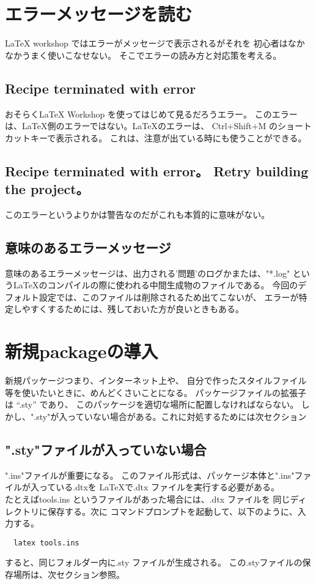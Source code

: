 \documentclass{ltjsarticle}
\begin{document}
\section{エラーメッセージを読む}
LaTeX workshop ではエラーがメッセージで表示されるがそれを
初心者はなかなかうまく使いこなせない。
そこでエラーの読み方と対応策を考える。
\subsection{Recipe terminated with error}
おそらくLaTeX Workshop を使ってはじめて見るだろうエラー。
このエラーは、\LaTeX 側のエラーではない。\LaTeX のエラーは、
Ctrl+Shift+M のショートカットキーで表示される。
これは、注意が出ている時にも使うことができる。
\subsection{Recipe terminated with error。 Retry building the project。}
このエラーというよりかは警告なのだがこれも本質的に意味がない。
\subsection{意味のあるエラーメッセージ}
意味のあるエラーメッセージは、出力される'問題'のログかまたは、"*.log"
という\LaTeX のコンパイルの際に使われる中間生成物のファイルである。
今回のデフォルト設定では、このファイルは削除されるため出てこないが、
エラーが特定しやすくするためには、残しておいた方が良いときもある。

\section{新規packageの導入}
新規パッケージつまり、インターネット上や、
自分で作ったスタイルファイル等を使いたいときに、めんどくさいことになる。
パッケージファイルの拡張子は “.sty” であり、
このパッケージを適切な場所に配置しなければならない。
しかし、".sty"が入っていない場合がある。これに対処するためには次セクション
\subsection{".sty"ファイルが入っていない場合}
".ins"ファイルが重要になる。
このファイル形式は、パッケージ本体と".ins"ファイルが入っている.dtxを
\LaTeX で.dtx ファイルを実行する必要がある。\\
たとえばtools.ins というファイルがあった場合には、.dtx ファイルを
同じディレクトリに保存する。次に
コマンドプロンプトを起動して、以下のように、入力する。
\begin{verbatim}
  latex tools.ins
\end{verbatim}
すると、同じフォルダー内に.sty ファイルが生成される。
この.styファイルの保存場所は、次セクション参照。
\end{document}
